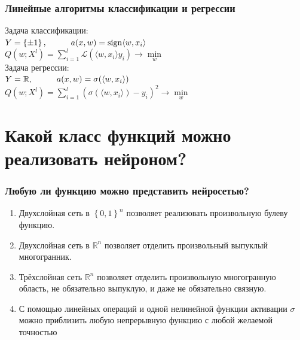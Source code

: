 \documentclass[10pt]{beamer}
\begin{document}
\begin{frame}\frametitle{Линейные алгоритмы классификации и регрессии}
	Задача классификации: \\
	$Y = \left\{ \pm1 \right\}, \hspace{10mm} a(x,w) = \sign \langle w, x_i \rangle $\\
	$Q(w;X^l) = \sum\limits_{i=1}^l \mathcal{L} (\langle w, x_i\rangle y_i) \rightarrow \min\limits_w$\\
	\bigbreak
	\pause
	Задача регрессии:\\
	$Y = \mathbb{R}, \hspace{10mm} a(x,w) = \sigma(\langle w, x_i \rangle)$\\
	$Q(w;X^l) = \sum\limits_{i=1}^l (\sigma(\langle w, x_i \rangle) - y_i)^2 \rightarrow \min\limits_w $
\end{frame}

\section{Какой класс функций можно реализовать нейроном?}

\begin{frame}\frametitle{Любую ли функцию можно представить нейросетью?}
	\begin{enumerate}[--]
		\item Двухслойная сеть в $\left\{0, 1 \right\}^n$ позволяет реализовать произвольную булеву функцию.
		\item Двухслойная сеть в $\mathbb{R}^n$ позволяет отделить произвольный выпуклый многогранник.
		\item Трёхслойная сеть $\mathbb{R}^n$ позволяет отделить произвольную многогранную область, не обязательно выпуклую, и даже не обязательно связную.
		\item С помощью линейных операций и одной нелинейной функции активации $\sigma$ можно приблизить любую непрерывную функцию с любой желаемой точностью
	\end{enumerate}
\end{frame}
\end{document}
